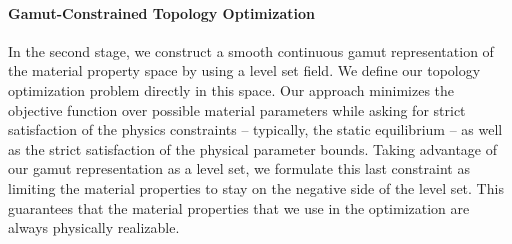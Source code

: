 \paragraph{Gamut-Constrained Topology Optimization}
In the second stage, we construct a smooth continuous gamut representation of the material property space by using a level set field. We define our topology optimization problem directly in this space. Our approach minimizes the objective function over possible material parameters while asking for strict satisfaction of the physics constraints -- typically, the static equilibrium -- as well as the strict satisfaction of the physical parameter bounds. Taking advantage of our gamut representation as a level set, we formulate this last constraint as limiting the material properties to stay on the negative side of the level set. This guarantees that the material properties that we use in the optimization are always physically realizable.
